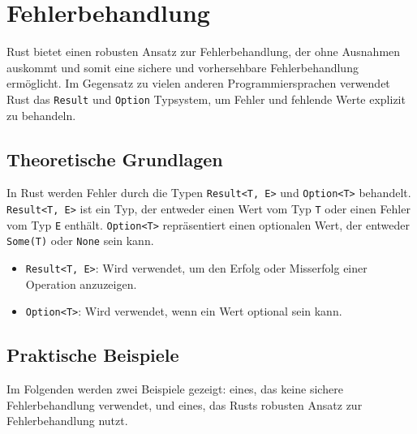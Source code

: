 \chapter{Fehlerbehandlung}
Rust bietet einen robusten Ansatz zur Fehlerbehandlung, der ohne Ausnahmen auskommt und somit eine sichere und vorhersehbare Fehlerbehandlung ermöglicht. Im Gegensatz zu vielen anderen Programmiersprachen verwendet Rust das \texttt{Result} und \texttt{Option} Typsystem, um Fehler und fehlende Werte explizit zu behandeln.

\section{Theoretische Grundlagen}
In Rust werden Fehler durch die Typen \texttt{Result<T, E>} und \texttt{Option<T>} behandelt. \texttt{Result<T, E>} ist ein Typ, der entweder einen Wert vom Typ \texttt{T} oder einen Fehler vom Typ \texttt{E} enthält. \texttt{Option<T>} repräsentiert einen optionalen Wert, der entweder \texttt{Some(T)} oder \texttt{None} sein kann.

\begin{itemize}
    \item \texttt{Result<T, E>}: Wird verwendet, um den Erfolg oder Misserfolg einer Operation anzuzeigen.
    \item \texttt{Option<T>}: Wird verwendet, wenn ein Wert optional sein kann.
\end{itemize}

\section{Praktische Beispiele}
Im Folgenden werden zwei Beispiele gezeigt: eines, das keine sichere Fehlerbehandlung verwendet, und eines, das Rusts robusten Ansatz zur Fehlerbehandlung nutzt.

